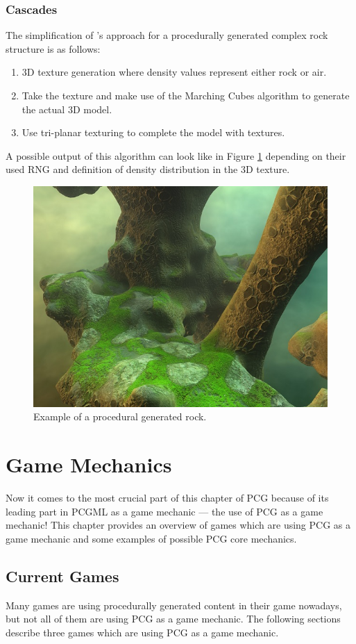 \documentclass[MGS,Master,english]{twbook}%
\begin{document}
\subsubsection{Cascades}
The simplification of 's approach for a procedurally generated complex rock structure is as follows:
\begin{enumerate}
	\item 3D texture generation where density values represent either rock or air.
	\item Take the texture and make use of the Marching Cubes algorithm to generate the actual 3D model.
	\item Use tri-planar texturing to complete the model with textures.
\end{enumerate}
A possible output of this algorithm can look like in Figure \ref{cascadesFigure} depending on their used \ac{RNG} and definition of density distribution in the 3D texture. 
\begin{figure}[!htbp]
	\centering
	\includegraphics[width=0.5\linewidth]{PICs/cascades_small}
	\caption{Example of a procedural generated rock. \protect\cite{nvidia::cascades}}\label{cascadesFigure}
\end{figure}

\section{Game Mechanics}
Now it comes to the most crucial part of this chapter of PCG because of its leading part in PCGML as a game mechanic — the use of PCG as a game mechanic! This chapter provides an overview of games which are using PCG as a game mechanic and some examples of possible PCG core mechanics.

\subsection{Current Games} \label{pcgMechanicGames}
Many games are using procedurally generated content in their game nowadays, but not all of them are using PCG as a game mechanic. The following sections describe three games which are using PCG as a game mechanic.
\end{document}
